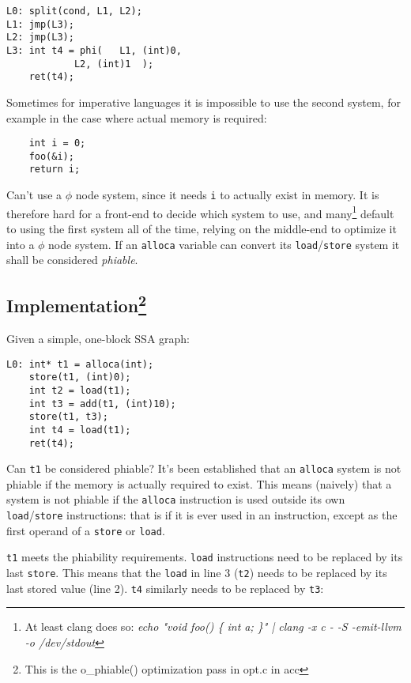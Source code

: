\documentclass[12pt, a4paper]{article}
\begin{document}
\begin{lstlisting}
L0:	split(cond, L1, L2);
L1:	jmp(L3);
L2:	jmp(L3);
L3:	int t4 = phi(	L1, (int)0,
			L2, (int)1	);
	ret(t4);
\end{lstlisting}

Sometimes for imperative languages it is impossible to use the second system, 
for example in the case where actual memory is required:

\begin{lstlisting}
	int i = 0;
	foo(&i);
	return i;
\end{lstlisting}

Can't use a $\phi$ node system, since it needs \verb+i+ to actually exist in 
memory. It is therefore hard for a front-end to decide which system to use, and 
many\footnote{At least clang does so: \textit{echo "void foo() \{ int a; \}" |
 clang -x c - -S -emit-llvm -o /dev/stdout}}
default to using the first system all of the time, relying on the 
middle-end to optimize it into a $\phi$ node system. If an \verb+alloca+ 
variable can convert its \verb+load+/\verb+store+ system it shall be considered 
\textit{phiable}.

\subsection[Implementation] {Implementation\footnote{This is the o\_phiable() optimization pass in opt.c in acc} }
Given a simple, one-block SSA graph:

\begin{lstlisting}
L0:	int* t1 = alloca(int);
	store(t1, (int)0);
	int t2 = load(t1);
	int t3 = add(t1, (int)10);
	store(t1, t3);
	int t4 = load(t1);
	ret(t4);
\end{lstlisting}

Can \verb+t1+ be considered phiable? It's been established that an \verb+alloca+ system 
is not phiable if the memory is actually required to exist. This means (naively) 
that a system is not phiable if the \verb+alloca+ instruction is used outside 
its own \verb+load+/\verb+store+ instructions: that is if it is ever used in an 
instruction, except as the first operand of a \verb+store+ or \verb+load+.

\verb+t1+ meets the phiability requirements. \verb+load+ instructions need to be 
replaced by its last \verb+store+. This means that the \verb+load+ in line 3 
(\verb+t2+) needs to be replaced by its last stored value (line 2). \verb+t4+ 
similarly needs to be replaced by \verb+t3+:
\end{document}
